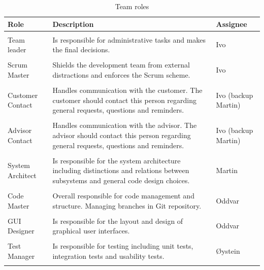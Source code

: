 \begin{table}
\caption{Team roles}
\begin{tabularx}{\textwidth}{ l X l }
  \textbf{Role} & \textbf{Description} & \textbf{Assignee} \\ 
  \hline \\ [-1.5ex]
  Team leader & Is responsible for administrative tasks and makes the final decisions. & Ivo \vspace*{0.7ex} \\ 
  \hline \\ [-1.5ex]
  Scrum Master & Shields the development team from external distractions and enforces the Scrum scheme.  & Ivo \vspace*{0.7ex}  \\ 
  \hline \\ [-1.5ex]
  Customer Contact & Handles communication with the customer. The customer should contact this person regarding general requests, questions and reminders. & Ivo (backup Martin) \vspace*{0.7ex}  \\ 
  \hline \\ [-1.5ex]
  Advisor Contact & Handles communication with the advisor. The advisor should contact this person regarding general requests, questions and reminders.  & Ivo (backup Martin) \vspace*{0.7ex} \\ 
  \hline \\ [-1.5ex]
  System Architect & Is responsible for the system architecture including distinctions and relations between subsystems and general code design choices. & Martin \vspace*{0.7ex} \\ 
  \hline \\ [-1.5ex]
  Code Master & Overall responsible for code management and structure. Managing branches in Git repository. & Oddvar \vspace*{0.7ex}  \\ 
  \hline \\ [-1.5ex]
  GUI Designer & Is responsible for the layout and design of graphical user interfaces. & Oddvar \vspace*{0.7ex} \\ 
  \hline \\ [-1.5ex]
  Test Manager & Is responsible for testing including unit tests, integration tests and usability tests. & Øystein \vspace*{0.7ex} \\ 
  \hline \\ [-1.5ex]

\end{tabularx}
\end{table}

